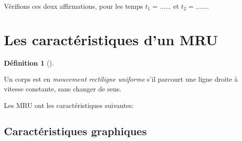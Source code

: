 \documentclass[
  letterpaper,
  DIV=11,
  numbers=noendperiod]{scrartcl}
\theoremstyle{definition}
\newtheorem{definition}{Définition}[section]
\theoremstyle{definition}
\theoremstyle{remark}
\begin{document}
Vérifions ces deux affirmations, pour les temps \(t_1=\ldots\ldots\) et
\(t_2=\ldots\ldots\).

\vspace{2cm}

\section{Les caractéristiques d'un
MRU}\label{les-caractuxe9ristiques-dun-mru}

\begin{definition}[]\protect\hypertarget{def-mru}{}\label{def-mru}

Un corps est en \emph{mouvement rectiligne uniforme} s'il parcourt une
ligne droite à vitesse constante, sans changer de sens.

\end{definition}

Les MRU ont les caractéristiques suivantes:

\subsection{Caractéristiques
graphiques}\label{caractuxe9ristiques-graphiques}
\end{document}

